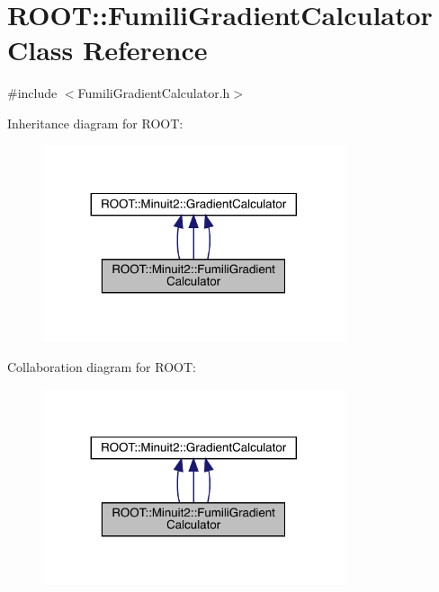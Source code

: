 \hypertarget{classROOT_1_1Minuit2_1_1FumiliGradientCalculator}{}\section{R\+O\+OT\+:\+:Fumili\+Gradient\+Calculator Class Reference}
\label{classROOT_1_1Minuit2_1_1FumiliGradientCalculator}


{\ttfamily \#include $<$Fumili\+Gradient\+Calculator.\+h$>$}



Inheritance diagram for R\+O\+OT\+:
\nopagebreak
\begin{figure}[H]
\begin{center}
\leavevmode
\includegraphics[width=251pt]{da/dc6/classROOT_1_1Minuit2_1_1FumiliGradientCalculator__inherit__graph}
\end{center}
\end{figure}


Collaboration diagram for R\+O\+OT\+:
\nopagebreak
\begin{figure}[H]
\begin{center}
\leavevmode
\includegraphics[width=251pt]{d0/d4a/classROOT_1_1Minuit2_1_1FumiliGradientCalculator__coll__graph}
\end{center}
\end{figure}
